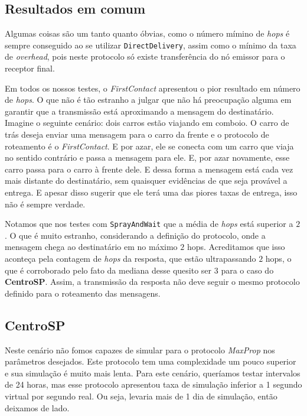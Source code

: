 \documentclass[conference]{IEEEtran}
\begin{document}
\subsection{Resultados em comum}
\label{sec:resultados:comum}
Algumas coisas são um tanto quanto óbvias, como o número mímino de \textit{hops} é sempre conseguido ao se utilizar \texttt{DirectDelivery}, assim como o mínimo da taxa de \textit{overhead}, pois neste protocolo só existe transferência do nó emissor para o receptor final.

Em todos os nossos testes, o \textit{FirstContact} apresentou o pior resultado em número de \textit{hops}. O que não é tão estranho a julgar que não há preocupação alguma em garantir que a transmissão está aproximando a mensagem do destinatário. Imagine o seguinte cenário: dois carros estão viajando em comboio. O carro de trás deseja enviar uma mensagem para o carro da frente e o protocolo de roteamento é o \textit{FirstContact}. E por azar, ele se conecta com um carro que viaja no sentido contrário e passa a mensagem para ele. E, por azar novamente, esse carro passa para o carro à frente dele. E dessa forma a mensagem está cada vez mais distante do destinatário, sem quaisquer evidências de que seja provável a entrega. E apesar disso sugerir que ele terá uma das piores taxas de entrega, isso não é sempre verdade.

Notamos que nos testes com \texttt{SprayAndWait} que a média de \textit{hops} está superior a $2$. O que é muito estranho, considerando a definição do protocolo, onde a mensagem chega ao destinatário em no máximo $2$ hops. Acreditamos que isso aconteça pela contagem de \textit{hops} da resposta, que estão ultrapassando $2$ hops, o que é corroborado pelo fato da mediana desse quesito ser $3$ para o caso do \textbf{CentroSP}. Assim, a transmissão da resposta não deve seguir o mesmo protocolo definido para o roteamento das mensagens.

\subsection{CentroSP}
Neste cenário não fomos capazes de simular para o protocolo \emph{MaxProp} nos parâmetros desejados. Este protocolo tem uma complexidade um pouco superior e sua simulação é muito mais lenta. Para este cenário, queríamos testar intervalos de 24 horas, mas esse protocolo apresentou taxa de simulação inferior a 1 segundo virtual por segundo real. Ou seja, levaria mais de 1 dia de simulação, então deixamos de lado.
\end{document}
